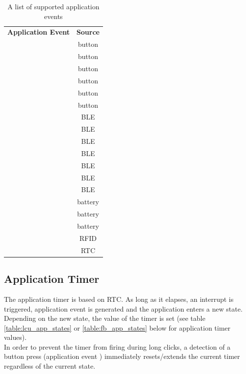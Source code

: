         \begin{table}[!ht]
            \begin{tabular}{l!{\vrule width 1pt}c}
                \textbf{Application Event} &  \textbf{Source}\\ 
                \Xhline{1\arrayrulewidth}
                 & button \\\hline
                 & button \\\hline
                 & button \\\hline
                 & button \\\hline
                 & button \\\hline
                 & button \\\hline
                 & BLE\\\hline
                 & BLE\\\hline
                 & BLE\\\hline
                 & BLE\\\hline
                 & BLE\\\hline
                 & BLE\\\hline
                 & BLE\\\hline
                 & battery \\\hline
                 & battery\\\hline
                 & battery\\\hline
                 & RFID\\\hline
                 & RTC
            \end{tabular}
            \caption{A list of supported application events}
            \label{table:app_events}
        \end{table}
        
    \subsection{Application Timer}
        \label{sec:apptimer}
        The application timer is based on RTC. As long as it elapses, an interrupt is triggered, application event  is generated and the application enters a new state. 
        Depending on the new state, the value of the timer is set (see table \ref{table:lcu_app_states} or \ref{table:fb_app_states} below for application timer values).\\
        In order to prevent the timer from firing during long clicks, a detection of a button press (application event ) immediately resets/extends the current timer regardless of the current state.
        

